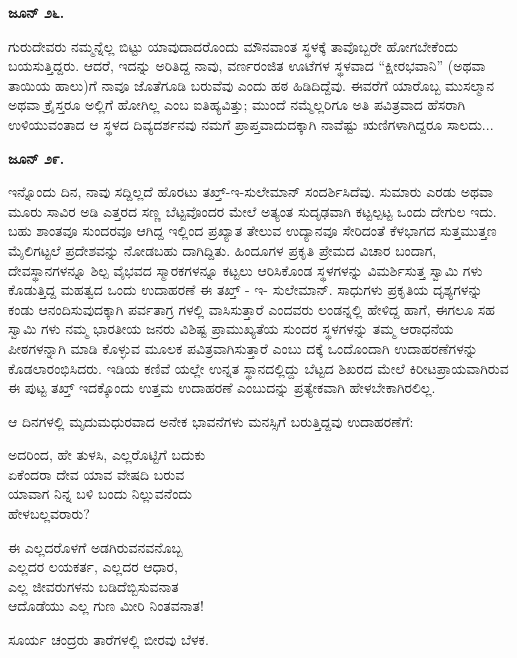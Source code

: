 \textbf{ಜೂನ್ ೨೬.}

ಗುರುದೇವರು ನಮ್ಮನ್ನೆಲ್ಲ ಬಿಟ್ಟು ಯಾವುದಾದರೊಂದು ಮೌನವಾಂತ ಸ್ಥಳಕ್ಕೆ ತಾವೊಬ್ಬರೇ ಹೋಗಬೇಕೆಂದು ಬಯಸುತ್ತಿದ್ದರು. ಆದರೆ, ಇದನ್ನು ಅರಿತಿದ್ದ ನಾವು, ವರ್ಣರಂಜಿತ ಊಟೆಗಳ ಸ್ಥಳವಾದ “ಕ್ಷೀರಭವಾನಿ” (ಅಥವಾ ತಾಯಿಯ ಹಾಲು)ಗೆ ನಾವೂ ಜೊತೆಗೂಡಿ ಬರುವೆವು ಎಂದು ಹಠ ಹಿಡಿದಿದ್ದೆವು. ಈವರೆಗೆ ಯಾರೊಬ್ಬ ಮುಸಲ್ಮಾನ ಅಥವಾ ಕ್ರೈಸ್ತರೂ ಅಲ್ಲಿಗೆ ಹೋಗಿಲ್ಲ ಎಂಬ ಐತಿಹ್ಯವಿತ್ತು; ಮುಂದೆ ನಮ್ಮೆಲ್ಲರಿಗೂ ಅತಿ ಪವಿತ್ರವಾದ ಹೆಸರಾಗಿ ಉಳಿಯುವಂತಾದ ಆ ಸ್ಥಳದ ದಿವ್ಯದರ್ಶನವು ನಮಗೆ ಪ್ರಾಪ್ತವಾದುದಕ್ಕಾಗಿ ನಾವೆಷ್ಟು ಋಣಿಗಳಾಗಿದ್ದರೂ ಸಾಲದು...

\textbf{ಜೂನ್ ೨೯.}

ಇನ್ನೊಂದು ದಿನ, ನಾವು ಸದ್ದಿಲ್ಲದೆ ಹೊರಟು ತಖ್ತ್-ಇ-ಸುಲೇಮಾನ್ ಸಂದರ್ಶಿಸಿದೆವು. ಸುಮಾರು ಎರಡು ಅಥವಾ ಮೂರು ಸಾವಿರ ಅಡಿ ಎತ್ತರದ ಸಣ್ಣ ಬೆಟ್ಟವೊಂದರ ಮೇಲೆ ಅತ್ಯಂತ ಸುದೃಢವಾಗಿ ಕಟ್ಟಲ್ಪಟ್ಟ ಒಂದು ದೇಗುಲ ಇದು. ಬಹು ಶಾಂತವೂ ಸುಂದರವೂ ಆಗಿದ್ದ ಇಲ್ಲಿಂದ ಪ್ರಖ್ಯಾತ ತೇಲುವ ಉದ್ಯಾನವೂ ಸೇರಿದಂತೆ ಕೆಳಭಾಗದ ಸುತ್ತಮುತ್ತಣ ಮೈಲಿಗಟ್ಟಲೆ ಪ್ರದೇಶವನ್ನು ನೋಡಬಹು ದಾಗಿದ್ದಿತು. ಹಿಂದೂಗಳ ಪ್ರಕೃತಿ ಪ್ರೇಮದ ವಿಚಾರ ಬಂದಾಗ, ದೇವಸ್ಥಾನಗಳನ್ನೂ ಶಿಲ್ಪ ವೈಭವದ ಸ್ಮಾರಕಗಳನ್ನೂ ಕಟ್ಟಲು ಆರಿಸಿಕೊಂಡ ಸ್ಥಳಗಳನ್ನು ವಿಮರ್ಶಿಸುತ್ತ ಸ್ವಾಮಿ ಗಳು ಕೊಡುತ್ತಿದ್ದ ಮಹತ್ವದ ಒಂದು ಉದಾಹರಣೆ ಈ ತಖ್ತ್ - ಇ- ಸುಲೇಮಾನ್. ಸಾಧುಗಳು ಪ್ರಕೃತಿಯ ದೃಶ್ಯಗಳನ್ನು ಕಂಡು ಆನಂದಿಸುವುದಕ್ಕಾಗಿ ಪರ್ವತಾಗ್ರ ಗಳಲ್ಲಿ ವಾಸಿಸುತ್ತಾರೆ ಎಂದವರು ಲಂಡನ್ನಲ್ಲಿ ಹೇಳಿದ್ದ ಹಾಗೆ, ಈಗಲೂ ಸಹ ಸ್ವಾಮಿ ಗಳು ನಮ್ಮ ಭಾರತೀಯ ಜನರು ವಿಶಿಷ್ಟ ಪ್ರಾಮುಖ್ಯತೆಯ ಸುಂದರ ಸ್ಥಳಗಳನ್ನು ತಮ್ಮ ಆರಾಧನೆಯ ಪೀಠಗಳನ್ನಾಗಿ ಮಾಡಿ ಕೊಳ್ಳುವ ಮೂಲಕ ಪವಿತ್ರವಾಗಿಸುತ್ತಾರೆ ಎಂಬು ದಕ್ಕೆ ಒಂದೊಂದಾಗಿ ಉದಾಹರಣೆಗಳನ್ನು ಕೊಡಲಾರಂಭಿಸಿದರು. ಇಡಿಯ ಕಣಿವೆ ಯಲ್ಲೇ ಉನ್ನತ ಸ್ಥಾನದಲ್ಲಿದ್ದು ಬೆಟ್ಟದ ಶಿಖರದ ಮೇಲೆ ಕಿರೀಟಪ್ರಾಯವಾಗಿರುವ ಈ ಪುಟ್ಟ ತಖ್ತ್ ಇದಕ್ಕೊಂದು ಉತ್ತಮ ಉದಾಹರಣೆ ಎಂಬುದನ್ನು ಪ್ರತ್ಯೇಕವಾಗಿ ಹೇಳಬೇಕಾಗಿರಲಿಲ್ಲ.

ಆ ದಿನಗಳಲ್ಲಿ ಮೃದುಮಧುರವಾದ ಅನೇಕ ಭಾವನೆಗಳು ಮನಸ್ಸಿಗೆ ಬರುತ್ತಿದ್ದವು ಉದಾಹರಣೆಗೆ:

\begin{myquote}
ಅದರಿಂದ, ಹೇ ತುಳಸಿ, ಎಲ್ಲರೊಟ್ಟಿಗೆ ಬದುಕು\\ಏಕೆಂದರಾ ದೇವ ಯಾವ ವೇಷದಿ ಬರುವ\\ಯಾವಾಗ ನಿನ್ನ ಬಳಿ ಬಂದು ನಿಲ್ಲುವನೆಂದು\\ಹೇಳಬಲ್ಲವರಾರು?
\end{myquote}

\begin{myquote}
ಈ ಎಲ್ಲದರೊಳಗೆ ಅಡಗಿರುವನವನೊಬ್ಬ\\ಎಲ್ಲದರ ಲಯಕರ್ತ, ಎಲ್ಲದರ ಆಧಾರ,\\ಎಲ್ಲ ಜೀವರುಗಳನು ಬಡಿದೆಬ್ಬಿಸುವನಾತ\\ಆದೊಡೆಯು ಎಲ್ಲ ಗುಣ ಮೀರಿ ನಿಂತವನಾತ!
\end{myquote}

\begin{myquote}
ಸೂರ್ಯ ಚಂದ್ರರು ತಾರೆಗಳಲ್ಲಿ ಬೀರವು ಬೆಳಕ.
\end{myquote}

